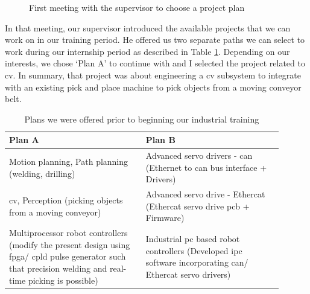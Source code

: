 \documentclass[a4paper,12pt]{report}%
\begin{document}
\begin{figure}[H]
	\centering
	
	\caption{First meeting with the supervisor to choose a project plan}
	\label{fig:firstmeet}
\end{figure}

In that meeting, our supervisor introduced the available projects that we can work on in our training period. He offered us two separate paths we can select to work during our internship period as described in Table \ref{table:familiarize}. Depending on our interests, we chose  `Plan A' to continue with and I selected the project related to \ac{cv}. In summary, that project was about engineering a \ac{cv} subsystem to integrate with an existing pick and place machine to pick objects from a moving conveyor belt.



\begin{table}[H]
	\captionsetup{font=sc, labelsep=newline}
	\centering
	\caption{Plans we were offered prior to beginning our industrial training}
	\begin{tabular}{|p{0.45\linewidth}  |p{0.45\linewidth}  |}
		\hline
		\textbf{Plan A} & \textbf{Plan B}\\\hline
		Motion planning, Path planning (welding, drilling) & 
		Advanced servo drivers - \Ac{can} (Ethernet to \ac{can} bus interface + Drivers)\\ \hline
		
		\ac{cv}, Perception (picking objects from a moving conveyor) &
		Advanced servo drive - Ethercat (Ethercat servo drive \ac{pcb} + Firmware)\\ \hline
		
		Multiprocessor robot controllers (modify the present design using \ac{fpga}/ \ac{cpld} pulse generator such that precision welding and real-time picking is possible)& 
		Industrial \ac{pc} based robot controllers (Developed \ac{ipc} software incorporating \ac{can}/ Ethercat servo drivers)\\
		\hline
	\end{tabular}
	\label{table:familiarize}
\end{table}
\end{document}
